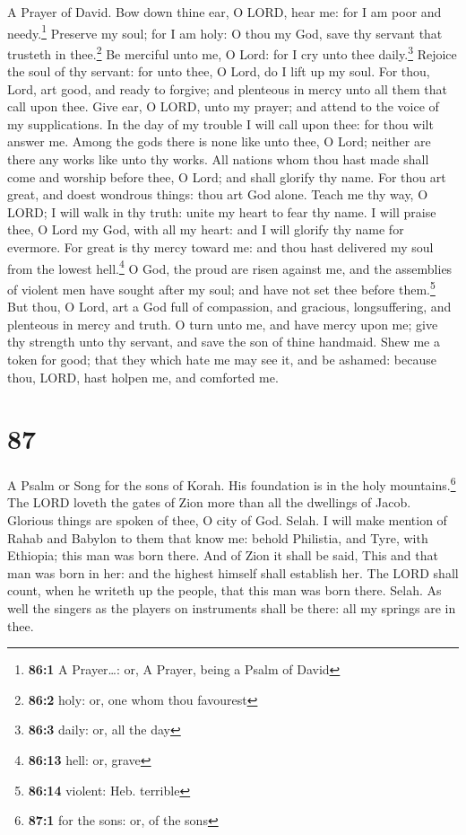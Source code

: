 A Prayer of David.  Bow down thine ear, O LORD, hear me:
for I am poor and needy.\footnote{\textbf{86:1} A Prayer\ldots: or, A
  Prayer, being a Psalm of David}  Preserve my soul; for I
am holy: O thou my God, save thy servant that trusteth in
thee.\footnote{\textbf{86:2} holy: or, one whom thou favourest}
 Be merciful unto me, O Lord: for I cry unto thee
daily.\footnote{\textbf{86:3} daily: or, all the day} 
Rejoice the soul of thy servant: for unto thee, O Lord, do I lift up my
soul.  For thou, Lord, art good, and ready to forgive; and
plenteous in mercy unto all them that call upon thee. 
Give ear, O LORD, unto my prayer; and attend to the voice of my
supplications.  In the day of my trouble I will call upon
thee: for thou wilt answer me.  Among the gods there is
none like unto thee, O Lord; neither are there any works like unto thy
works.  All nations whom thou hast made shall come and
worship before thee, O Lord; and shall glorify thy name. 
For thou art great, and doest wondrous things: thou art God alone.
 Teach me thy way, O LORD; I will walk in thy truth:
unite my heart to fear thy name.  I will praise thee, O
Lord my God, with all my heart: and I will glorify thy name for
evermore.  For great is thy mercy toward me: and thou
hast delivered my soul from the lowest hell.\footnote{\textbf{86:13}
  hell: or, grave}  O God, the proud are risen against
me, and the assemblies of violent men have sought after my soul; and
have not set thee before them.\footnote{\textbf{86:14} violent: Heb.
  terrible}  But thou, O Lord, art a God full of
compassion, and gracious, longsuffering, and plenteous in mercy and
truth.  O turn unto me, and have mercy upon me; give thy
strength unto thy servant, and save the son of thine handmaid.
 Shew me a token for good; that they which hate me may
see it, and be ashamed: because thou, LORD, hast holpen me, and
comforted me.

\hypertarget{section-86}{%
\section{87}\label{section-86}}

A Psalm or Song for the sons of Korah.  His foundation is
in the holy mountains.\footnote{\textbf{87:1} for the sons: or, of the
  sons}  The LORD loveth the gates of Zion more than all
the dwellings of Jacob.  Glorious things are spoken of
thee, O city of God. Selah.  I will make mention of Rahab
and Babylon to them that know me: behold Philistia, and Tyre, with
Ethiopia; this man was born there.  And of Zion it shall
be said, This and that man was born in her: and the highest himself
shall establish her.  The LORD shall count, when he
writeth up the people, that this man was born there. Selah.
 As well the singers as the players on instruments shall
be there: all my springs are in thee.


